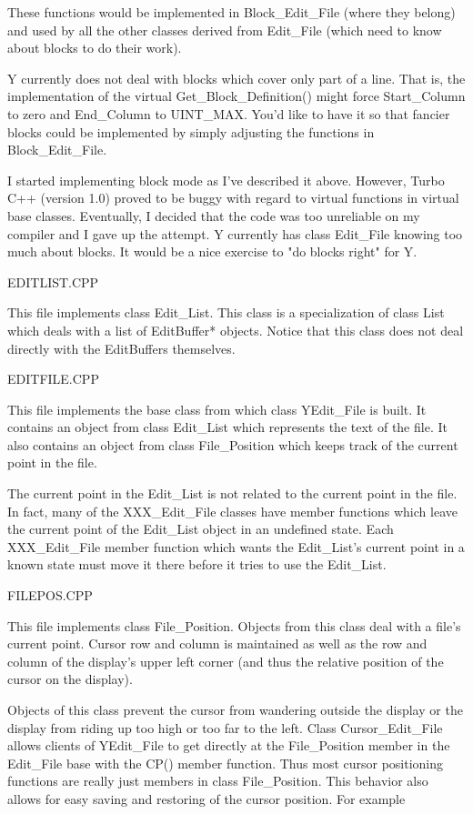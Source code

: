 These functions would be implemented in Block\_Edit\_File (where they belong) and used by all the
other classes derived from Edit\_File (which need to know about blocks to do their work).

Y currently does not deal with blocks which cover only part of a line. That is, the
implementation of the virtual Get\_Block\_Definition() might force Start\_Column to zero and
End\_Column to UINT\_MAX. You'd like to have it so that fancier blocks could be implemented by
simply adjusting the functions in Block\_Edit\_File.

I started implementing block mode as I've described it above. However, Turbo C++ (version 1.0)
proved to be buggy with regard to virtual functions in virtual base classes. Eventually, I
decided that the code was too unreliable on my compiler and I gave up the attempt. Y currently
has class Edit\_File knowing too much about blocks. It would be a nice exercise to "do blocks
right" for Y.

EDITLIST.CPP

This file implements class Edit\_List. This class is a specialization of class List which deals
with a list of EditBuffer* objects. Notice that this class does not deal directly with the
EditBuffers themselves.

EDITFILE.CPP

This file implements the base class from which class YEdit\_File is built. It contains an object
from class Edit\_List which represents the text of the file. It also contains an object from
class File\_Position which keeps track of the current point in the file.

The current point in the Edit\_List is not related to the current point in the file. In fact,
many of the XXX\_Edit\_File classes have member functions which leave the current point of the
Edit\_List object in an undefined state. Each XXX\_Edit\_File member function which wants the
Edit\_List's current point in a known state must move it there before it tries to use the
Edit\_List.

FILEPOS.CPP

This file implements class File\_Position. Objects from this class deal with a file's current
point. Cursor row and column is maintained as well as the row and column of the display's upper
left corner (and thus the relative position of the cursor on the display).

Objects of this class prevent the cursor from wandering outside the display or the display from
riding up too high or too far to the left. Class Cursor\_Edit\_File allows clients of YEdit\_File
to get directly at the File\_Position member in the Edit\_File base with the CP() member function.
Thus most cursor positioning functions are really just members in class File\_Position. This
behavior also allows for easy saving and restoring of the cursor position. For example

